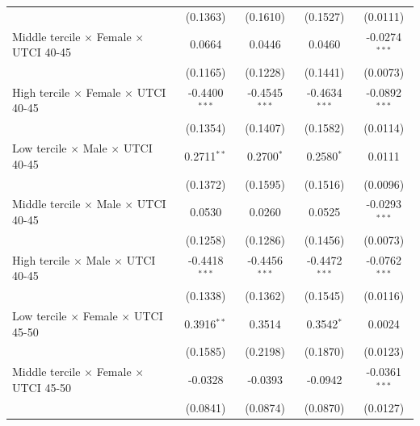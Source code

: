 \begin{table}[htbp]
\begin{tabular}{lcccc}
                                                           & (0.1363)        & (0.1610)            & (0.1527)          & (0.0111)\\   
      Middle tercile $\times$ Female $\times$ UTCI 40-45   & 0.0664          & 0.0446              & 0.0460            & -0.0274$^{***}$\\   
                                                           & (0.1165)        & (0.1228)            & (0.1441)          & (0.0073)\\   
      High tercile $\times$ Female $\times$ UTCI 40-45     & -0.4400$^{***}$ & -0.4545$^{***}$     & -0.4634$^{***}$   & -0.0892$^{***}$\\   
                                                           & (0.1354)        & (0.1407)            & (0.1582)          & (0.0114)\\   
      Low tercile $\times$ Male $\times$ UTCI 40-45        & 0.2711$^{**}$   & 0.2700$^{*}$        & 0.2580$^{*}$      & 0.0111\\   
                                                           & (0.1372)        & (0.1595)            & (0.1516)          & (0.0096)\\   
      Middle tercile $\times$ Male $\times$ UTCI 40-45     & 0.0530          & 0.0260              & 0.0525            & -0.0293$^{***}$\\   
                                                           & (0.1258)        & (0.1286)            & (0.1456)          & (0.0073)\\   
      High tercile $\times$ Male $\times$ UTCI 40-45       & -0.4418$^{***}$ & -0.4456$^{***}$     & -0.4472$^{***}$   & -0.0762$^{***}$\\   
                                                           & (0.1338)        & (0.1362)            & (0.1545)          & (0.0116)\\   
      Low tercile $\times$ Female $\times$ UTCI 45-50      & 0.3916$^{**}$   & 0.3514              & 0.3542$^{*}$      & 0.0024\\   
                                                           & (0.1585)        & (0.2198)            & (0.1870)          & (0.0123)\\   
      Middle tercile $\times$ Female $\times$ UTCI 45-50   & -0.0328         & -0.0393             & -0.0942           & -0.0361$^{***}$\\   
                                                           & (0.0841)        & (0.0874)            & (0.0870)          & (0.0127)\\   

\end{tabular}
\end{table}
